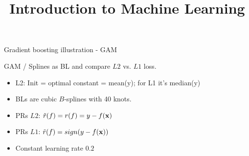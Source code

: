 \documentclass[11pt,compress,t,notes=noshow, xcolor=table]{beamer}
\title{Introduction to Machine Learning}
\begin{document}

\begin{vbframe}{Gradient boosting illustration - GAM}

GAM / Splines as BL and compare $L2$ vs. $L1$ loss.
\vspace*{0.2cm}

\begin{itemize}
  \item L2: Init = optimal constant = mean(y);
      for L1 it's median(y)
    \item BLs are cubic $B$-splines with 40 knots.
\item PRs $L2$: $\tilde{r}(f) = r(f) = y - f(\mathbf{x})$
\item PRs $L1$: $\tilde{r}(f) = sign(y - f(\mathbf{x}))$
    \item Constant learning rate $0.2$ 
\end{itemize}


\end{vbframe}
\end{document}

